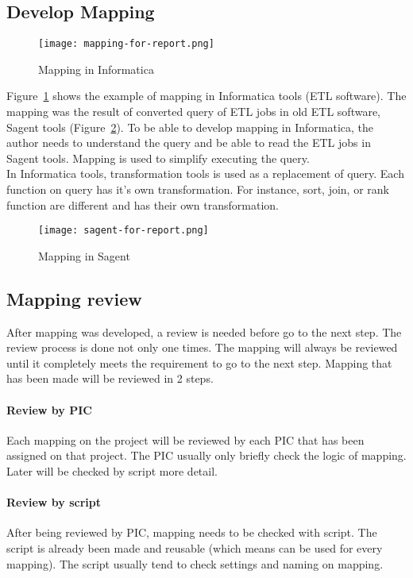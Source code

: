 \subsection{Develop Mapping}
\begin{figure}[H]
\centering
\texttt{[image: mapping-for-report.png]}
\caption{Mapping in Informatica}
\label{fig:mapinfa}
\end{figure}

Figure~\ref{fig:mapinfa} shows the example of mapping in Informatica tools (ETL software). The mapping was the result of converted query of ETL jobs in old ETL software, Sagent tools (Figure~\ref{fig:saginfa}). To be able to develop mapping in Informatica, the author needs to understand the query and be able to read the ETL jobs in Sagent tools. Mapping is used to simplify executing the query.\\

In Informatica tools, transformation tools is used as a replacement of query. Each function on query has it's own transformation. For instance, sort, join, or rank function are different and has their own transformation.

\begin{figure}[H]
\centering
\texttt{[image: sagent-for-report.png]}
\caption{Mapping in Sagent}
\label{fig:saginfa}
\end{figure}

\subsection{Mapping review}
After mapping was developed, a review is needed before go to the next step. The review process is done not only one times. The mapping will always be reviewed until it completely meets the requirement to go to the next step. Mapping that has been made will be reviewed in 2 steps.

\paragraph{Review by PIC}
Each mapping on the project will be reviewed by each PIC that has been assigned on that project. The PIC usually only briefly check the logic of mapping. Later will be checked by script more detail.

\paragraph{Review by script}
After being reviewed by PIC, mapping needs to be checked with script. The script is already been made and reusable (which means can be used for every mapping). The script usually tend to check settings and naming on mapping.

